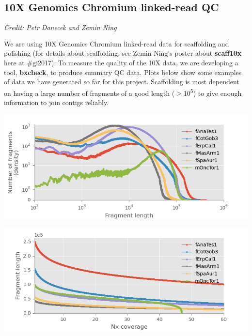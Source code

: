 \documentclass[a0,portrait]{a0poster}
\begin{document}
\begin{multicols}{2}


\section*{10X Genomics Chromium linked-read QC}

\emph{Credit: Petr Danecek and Zemin Ning}

\noindent We are using 10X Genomics Chromium linked-read data for scaffolding and polishing (for details about scaffolding, see Zemin Ning's poster about \textbf{scaff10x} here at \#gi2017). To measure the quality of the 10X data, we are developing a tool, \textbf{bxcheck}, to produce summary QC data. Plots below show some examples of data we have generated so far for this project. Scaffolding is most dependent on having a large number of fragments of a good length ($>$10\textsuperscript{5}) to give enough information to join contigs reliably.

\begin{center}
\captionsetup{type=figure}
\includegraphics[width=0.9\linewidth]{images/fragmentLength.png}
\end{center}

\begin{center}
\captionsetup{type=figure}
\includegraphics[width=0.9\linewidth]{images/NxCoverage.png}
\end{center}


\end{multicols}
\end{document}
